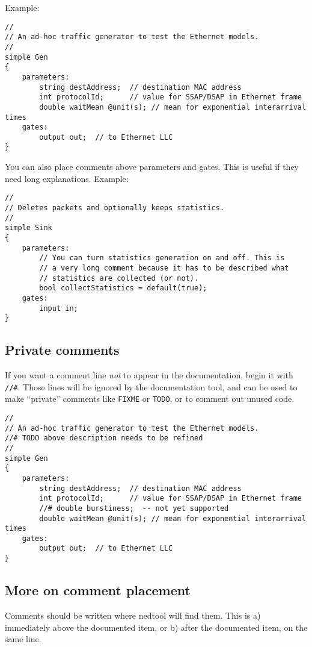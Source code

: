 Example:

\begin{verbatim}
//
// An ad-hoc traffic generator to test the Ethernet models.
//
simple Gen
{
    parameters:
        string destAddress;  // destination MAC address
        int protocolId;      // value for SSAP/DSAP in Ethernet frame
        double waitMean @unit(s); // mean for exponential interarrival times
    gates:
        output out;  // to Ethernet LLC
}
\end{verbatim}

You can also place comments above parameters and gates. This is useful
if they need long explanations. Example:

\begin{verbatim}
//
// Deletes packets and optionally keeps statistics.
//
simple Sink
{
    parameters:
        // You can turn statistics generation on and off. This is
        // a very long comment because it has to be described what
        // statistics are collected (or not).
        bool collectStatistics = default(true);
    gates:
        input in;
}
\end{verbatim}

\subsection{Private comments}

If you want a comment line \textit{not} to appear in the documentation,
begin it with \texttt{//\#}. Those lines will be ignored by the
documentation tool, and can be used to make ``private'' comments
like \texttt{FIXME} or \texttt{TODO}, or to comment out unused code.

\begin{verbatim}
//
// An ad-hoc traffic generator to test the Ethernet models.
//# TODO above description needs to be refined
//
simple Gen
{
    parameters:
        string destAddress;  // destination MAC address
        int protocolId;      // value for SSAP/DSAP in Ethernet frame
        //# double burstiness;  -- not yet supported
        double waitMean @unit(s); // mean for exponential interarrival times
    gates:
        output out;  // to Ethernet LLC
}
\end{verbatim}


\subsection{More on comment placement}

Comments should be written where nedtool will find them.
This is a) immediately above the documented item, or b) after the
documented item, on the same line.

